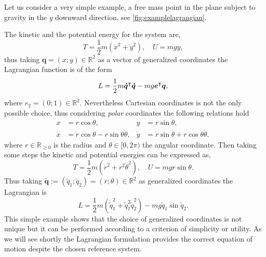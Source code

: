 		\begin{example}
			\label{ex:nonuniquessofq}
			Let us consider a very simple example, a free mass point in 
			the plane subject to gravity in the $y$ downward direction, 
			see \cref{fig:examplelagrangian}.
			
			The kinetic and the potential energy for the system are, 
			\begin{equation*}
				T = \frac{1}{2}m(\dot{x}^{2}+\dot{y}^{2}), \quad U = mgy,
			\end{equation*}
			thus taking $\bm{q} = (x;y)\in\mathbb{R}^{2}$ as a vector
			of generalized coordinates the Lagrangian function is of the form 
			\begin{equation*}
				L = \frac{1}{2}m\bm{\dot{q}}^{\intercal}\bm{\dot{q}} - mg\bm{e}^{\intercal}\bm{q},
			\end{equation*}
			where $e_{2}=(0;1)\in\mathbb{R}^{2}$.
			Nevertheless Cartesian coordinates is not the only possible choice,
			thus considering \emph{polar} coordinates the following relations hold
			\begin{subequations}
				\begin{align*}
					x &= r\cos{\theta}, & y &= r\sin{\theta}, \\
					\dot{x} &= \dot{r}\cos{\theta} -
					r\sin{\theta}\dot{\theta}, & \dot{y} &= \dot{r}\sin{\theta}+r\cos{\theta}\dot{\theta},
				\end{align*}
			\end{subequations}
			where $r\in\mathbb{R}_{\geq 0}$ is the radius and $\theta\in[0,2\pi)$ 
			the angular coordinate.
			Then taking some steps the kinetic and potential energies can be expressed as, 
			\begin{equation*}
				T = \frac{1}{2}m(\dot{r}^{2}+r^{2}\dot{\theta}^{2}), \quad U = mgr\sin{\theta}.
			\end{equation*}
			Thus taking $\widetilde{\bm{q}}:=(\widetilde{q}_{1};\widetilde{q}_{2})=(r;\theta)\in\mathbb{R}^{2}$ 
			as generalized coordinates the Lagrangian is
			\begin{equation}
				L = \frac{1}{2}m(\dot{\widetilde{q}}_{1}^{2}+\widetilde{q}_{1}^{2}
				\dot{\widetilde{q}}_{2}^{2}) - mg\widetilde{q}_{1}\sin{\widetilde{q}_{2}}.
			\end{equation}
			This simple example shows that the choice of generalized coordinates 
			is not unique but it can be performed according to a criterion of simplicity or utility.
			As we will see shortly the Lagrangian formulation provides the correct
			equation of motion despite the chosen reference system. 
		\end{example}
